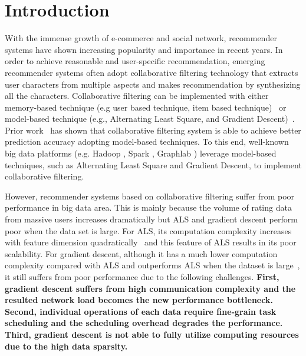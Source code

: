 \documentclass{llncs}
\begin{document}
\vspace{-30pt}
\section{Introduction}
\vspace{-5pt}

With the immense growth of e-commerce and social network, recommender systems have shown increasing popularity and importance in recent years.
In order to achieve reasonable and user-specific recommendation, emerging recommender systems often adopt collaborative filtering technology that  extracts user characters from multiple aspects and makes recommendation by synthesizing all the characters. Collaborative filtering  can be implemented with either memory-based technique (e.g user based technique, item based technique)~\cite{MemoryBasedCF} or model-based technique (e.g., Alternating Least Square, and Gradient Descent)~\cite{towards}. Prior work~\cite{MF2009,recSurvey2013} has shown that collaborative filtering system is able to achieve better prediction accuracy adopting model-based techniques. To this end, well-known big data platforms (e.g. Hadoop \cite{Hadoop}, Spark \cite{SparkMllib}, Graphlab \cite{graphlab}) leverage model-based techniques, such as Alternating Least Square and Gradient Descent, to implement collaborative filtering.


However, recommender systems based on collaborative filtering suffer from poor performance in big data area. This is mainly because the volume of rating data from massive users increases dramatically but ALS and gradient descent perform poor when the data set is large.
For ALS, its computation complexity increases with feature dimension quadratically~\cite{ibm2011} and this feature of ALS results in its poor scalability. For gradient descent, although it has a much lower computation complexity compared with ALS and outperforms ALS when the dataset is large~\cite{sgdKdd2015,sgdFast2015,ibm2011}, it still suffers from poor performance due to the following challenges.
\textbf{First, gradient descent suffers from high communication complexity and the resulted network load becomes the new performance bottleneck. Second, individual operations of each data require fine-grain task scheduling and the scheduling overhead degrades the performance. Third, gradient descent is not able to fully utilize computing resources due to the high data sparsity.}
\end{document}
